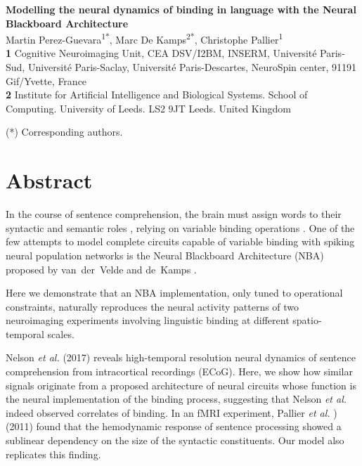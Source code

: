 \documentclass[10pt]{article}
\date{}
\begin{document}
\vspace*{0.2in}

\begin{flushleft} {\LARGE \textbf{Modelling the neural dynamics of
      binding in language with the Neural Blackboard Architecture} }
  \newline
  \\

  Martin Perez-Guevara\textsuperscript{1*}, Marc De Kamps\textsuperscript{2*}, Christophe Pallier\textsuperscript{1}
  \\
  \bigskip \textbf{1} Cognitive Neuroimaging Unit, CEA DSV/I2BM,
  INSERM, Université Paris-Sud, Université Paris-Saclay,
  Université Paris-Descartes, NeuroSpin center, 91191 Gif/Yvette, France
  \\
  \textbf{2} Institute for Artificial Intelligence and Biological
  Systems. School of Computing. University of Leeds. LS2 9JT Leeds.
  United Kingdom
  \\
  \bigskip


(*) Corresponding authors.
  
\end{flushleft}


\section*{Abstract}

In the course of sentence comprehension, the brain must assign words to their syntactic and semantic roles \cite{smolensky2006harmonic,Jackendoff_2002b}, relying on variable binding operations \cite{marcus14}.
One of the few attempts to model complete circuits capable of variable binding with spiking neural population networks is the Neural Blackboard Architecture (NBA) proposed by van~der~Velde and de~Kamps \cite{van_der_Velde_2006}.

Here we demonstrate that an NBA implementation, only tuned to operational constraints, naturally reproduces the neural activity patterns of two neuroimaging experiments involving linguistic binding at different spatio-temporal scales.

Nelson \emph{et al.} (2017) reveals high-temporal resolution neural dynamics of sentence comprehension from intracortical recordings (ECoG).
Here, we show how similar signals originate from a proposed architecture of neural circuits whose function is the neural implementation of the binding process, suggesting that Nelson \emph{et al.} indeed observed 
correlates of binding.
In an fMRI experiment, Pallier \emph{et al.} )(2011) found that the hemodynamic response of sentence processing showed a sublinear dependency
on the size of the syntactic constituents.
Our model also replicates this finding.
\end{document}
